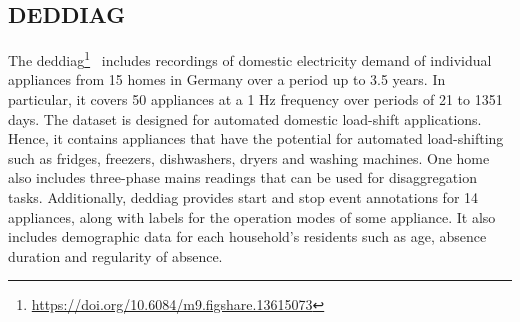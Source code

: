\subsection{DEDDIAG}

The \acrlong{deddiag}\footnote{\url{https://doi.org/10.6084/m9.figshare.13615073}}~\parencite{wenningerDEDDIAGDomesticElectricity2021} includes recordings of domestic electricity demand of individual appliances from 15 homes in Germany over a period up to 3.5 years. In particular, it covers 50 appliances at a 1 Hz frequency over periods of 21 to 1351 days. The dataset is designed for automated domestic load-shift applications. Hence, it contains appliances that have the potential for automated load-shifting such as fridges, freezers, dishwashers, dryers and washing machines. One home also includes three-phase mains readings that can be used for disaggregation tasks. Additionally, \acrshort{deddiag} provides start and stop event annotations for 14 appliances, along with labels for the operation modes of some appliance. It also includes demographic data for each household's residents such as age, absence duration and regularity of absence.

